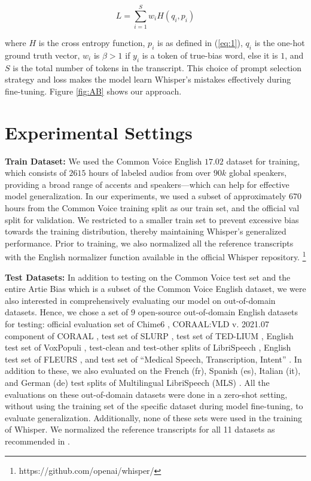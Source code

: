 \documentclass{article}
\begin{document}
\begin{equation}
    L = \sum_{i=1}^{S} w_i H(q_i, p_i)
\end{equation}

\noindent where $H$ is the cross entropy function, $p_i$ is as defined in (\ref{eq:1}), $q_i$ is the one-hot ground truth vector, $w_i$ is $\beta >1$ if $y_i$ is a token of true-bias word, else it is $1$, and $S$ is the total number of tokens in the transcript. This choice of prompt selection strategy and loss makes the model learn Whisper's mistakes effectively during fine-tuning. Figure \ref{fig:AB} shows our approach.

\section{Experimental Settings}

\textbf{Train Dataset:} We used the Common Voice \cite{cv} English $17.02$ dataset for training, which consists of $2615$ hours of  labeled audios from over $90k$ global speakers, providing a broad range of accents and speakers---which can help for effective model generalization. In our experiments, we used a subset of approximately $670$ hours from the Common Voice training split as our train set, and the official val split for validation. We restricted to a smaller train set to prevent excessive bias towards the training distribution, thereby maintaining Whisper’s generalized performance. Prior to training, we also normalized all the reference transcripts with the English normalizer function available in the official Whisper repository. \footnote{https://github.com/openai/whisper/}

\textbf{Test Datasets:} In addition to testing on the Common Voice test set and the entire Artie Bias \cite{artie} which is a subset of the Common Voice English dataset, we were also interested in comprehensively evaluating our model on out-of-domain datasets. Hence, we chose a set of $9$ open-source out-of-domain English datasets for testing: official evaluation set of Chime6 \cite{chime}, CORAAL:VLD v. 2021.07 component of CORAAL \cite{coraal}, test set of SLURP \cite{slurp}, test set of TED-LIUM \cite{tedlium}, English test set of VoxPopuli \cite{vox}, test-clean and test-other splits of LibriSpeech \cite{Libri}, English test set of FLEURS \cite{fleurs}, and test set of ``Medical Speech, Transcription, Intent'' \cite{medical}. In addition to these, we also evaluated on the French (fr), Spanish (es), Italian (it), and German (de) test splits of Multilingual LibriSpeech (MLS) \cite{MLS}. All the evaluations on these out-of-domain datasets were done in a zero-shot setting, without using the training set of the specific dataset during model fine-tuning, to evaluate generalization. Additionally, none of these sets were used in the training of Whisper. We normalized the reference transcripts for all 11 datasets as recommended in \cite{whisper}.
\end{document}
